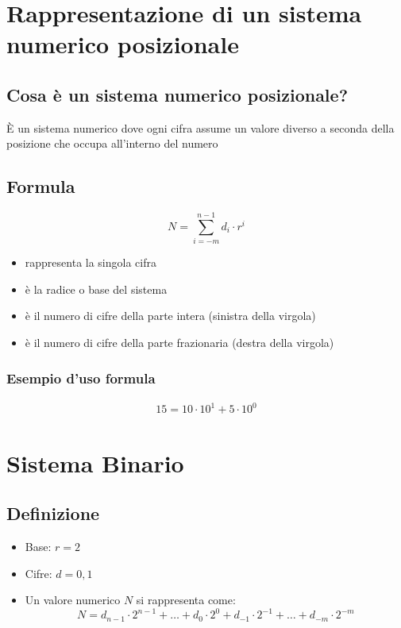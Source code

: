 \newpage
\section{Rappresentazione di un sistema numerico posizionale}
\subsection{Cosa è un sistema numerico posizionale?}
È un sistema numerico dove ogni cifra assume un valore diverso a seconda della posizione che occupa all'interno del numero

\subsection{Formula}
\begin{tcolorbox}
    {
        \LARGE
        $$
            N = \sum^{n-1}_{i=-m} d_i \cdot r^i
        $$
    }
    \begin{itemize}
        \item[$d$ -] rappresenta la singola cifra
        \item [$r$ -] è la radice o base del sistema
        \item [$n$ -] è il numero di cifre della parte intera (sinistra della virgola)
        \item [$m$ -] è il numero di cifre della parte frazionaria (destra della virgola)
    \end{itemize}
    
    \subsubsection{Esempio d'uso formula}
    {
        \Large
        \begin{gather*}
            15 = 10 \cdot 10^1 + 5 \cdot 10^0
        \end{gather*}
    }
\end{tcolorbox}

\section{Sistema Binario}
\subsection{Definizione}
\begin{itemize}
    \item Base: $r=2$
    \item Cifre: $d=0,1$
    \item Un valore numerico $N$ si rappresenta come:
    {\large
        $$
            N = d_{n-1} \cdot 2^{n-1} + \dots + d_0 \cdot 2^0 + d_{-1} \cdot 2^{-1} + \dots + d_{-m} \cdot 2^{-m}
        $$
    }
\end{itemize}

